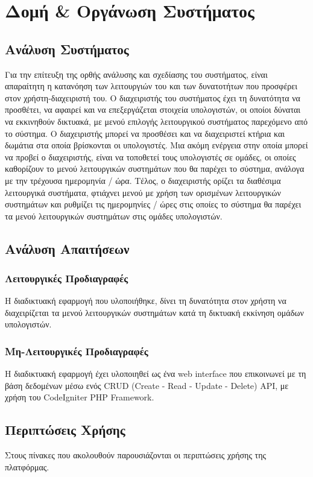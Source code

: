 \chapter{Δομή \& Οργάνωση Συστήματος}

\section{Ανάλυση Συστήματος}
Για την επίτευξη της ορθής ανάλυσης και σχεδίασης του συστήματος, είναι απαραίτητη η κατανόηση των λειτουργιών του και των δυνατοτήτων που προσφέρει στον χρήστη-διαχειριστή του. Ο διαχειριστής του συστήματος έχει τη δυνατότητα να προσθέτει, να αφαιρεί και να επεξεργάζεται στοιχεία υπολογιστών, οι οποίοι δύναται να εκκινηθούν δικτυακά, με μενού επιλογής λειτουργικού συστήματος παρεχόμενο από το σύστημα. Ο διαχειριστής μπορεί να προσθέσει και να διαχειριστεί κτήρια και δωμάτια στα οποία βρίσκονται οι υπολογιστές. Μια ακόμη ενέργεια στην οποία μπορεί να προβεί ο διαχειριστής, είναι να τοποθετεί τους υπολογιστές σε ομάδες, οι οποίες καθορίζουν το μενού λειτουργικών συστημάτων που θα παρέχει το σύστημα, ανάλογα με την τρέχουσα ημερομηνία / ώρα. Τέλος, ο διαχειριστής ορίζει τα διαθέσιμα λειτουργικά συστήματα, φτιάχνει μενού με χρήση των ορισμένων λειτουργικών συστημάτων και ρυθμίζει τις ημερομηνίες / ώρες στις οποίες το σύστημα θα παρέχει τα μενού λειτουργικών συστημάτων στις ομάδες υπολογιστών.
 
\section{Ανάλυση Απαιτήσεων}

\subsection{Λειτουργικές Προδιαγραφές}
Η διαδικτυακή εφαρμογή που υλοποιήθηκε, δίνει τη δυνατότητα στον χρήστη να διαχειρίζεται τα μενού λειτουργικών συστημάτων κατά τη δικτυακή εκκίνηση ομάδων υπολογιστών.

\subsection{Μη-Λειτουργικές Προδιαγραφές}
Η διαδικτυακή εφαρμογή έχει υλοποιηθεί ως ένα web interface που επικοινωνεί με τη βάση δεδομένων μέσω ενός CRUD (Create - Read - Update - Delete) API, με χρήση του CodeIgniter PHP Framework.

\section{Περιπτώσεις Χρήσης}
Στους πίνακες που ακολουθούν παρουσιάζονται οι περιπτώσεις χρήσης της πλατφόρμας.

